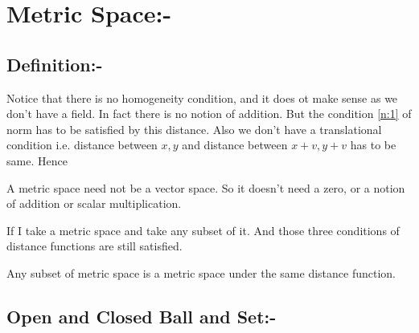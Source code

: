 \chapter{Metric Space:-}
\section{Definition:-}
Notice that there is no homogeneity condition, and it does ot make sense as we don't have a field. In fact there is no notion of addition. But the condition \ref{n:1} of norm has to be satisfied by this distance. Also we don't have a translational condition i.e. distance between $x,y$ and distance  between $x+v,y+v$ has to be same. Hence
\begin{note}
	A metric space need not be a vector space. So it doesn't need a zero, or a notion of addition or scalar multiplication.
\end{note}
If I take a metric space and take any subset of it. And those three conditions of distance functions are still satisfied.
\begin{note}
	Any subset of metric space is a metric space under the same distance function.
\end{note}
\section{Open and Closed Ball and Set:-}



